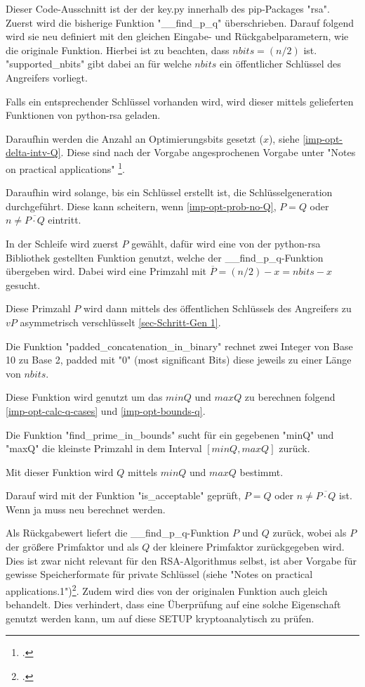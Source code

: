         Dieser Code-Ausschnitt ist der der key.py innerhalb des pip-Packages "rsa".
        Zuerst wird die bisherige Funktion "\_\_find\_p\_q" überschrieben.
        Darauf folgend wird sie neu definiert mit den gleichen Eingabe- und Rückgabelparametern, wie die originale Funktion.
        Hierbei ist zu beachten, dass $nbits = (n/2)$ ist.
        "supported\_nbits" gibt dabei an für welche $nbits$ ein öffentlicher Schlüssel des Angreifers vorliegt. 
        
        Falls ein entsprechender Schlüssel vorhanden wird, wird dieser mittels gelieferten Funktionen von python-rsa geladen.

        Daraufhin werden die Anzahl an Optimierungsbits gesetzt ($x$), siehe \ref{imp-opt-delta-intv-Q}. Diese sind nach der Vorgabe angesprochenen Vorgabe unter "Notes on practical applications" \footcite[1]{dimgt:rsa}.

        Daraufhin wird solange, bis ein Schlüssel erstellt ist, die Schlüsselgeneration durchgeführt. Diese kann scheitern, wenn \ref{imp-opt-prob-no-Q}, $P = Q$ oder $n \neq \overline{P \cdot Q}$ eintritt.

        In der Schleife wird zuerst $P$ gewählt, dafür wird eine von der python-rsa Bibliothek gestellten Funktion genutzt, welche der \_\_find\_p\_q-Funktion übergeben wird. Dabei wird eine Primzahl mit $\overline{P} = (n/2) - x = nbits -  x$ gesucht.
        
        Diese Primzahl $P$ wird dann mittels des öffentlichen Schlüssels des Angreifers zu $vP$ asymmetrisch verschlüsselt \ref{sec-Schritt-Gen 1}.

        Die Funktion "padded\_concatenation\_in\_binary" rechnet zwei Integer von Base 10 zu Base 2, padded mit "0" (most significant Bits) diese jeweils zu einer Länge von $nbits$. 

        Diese Funktion wird genutzt um das $minQ$ und $maxQ$ zu berechnen folgend \ref{imp-opt-calc-q-cases} und \ref{imp-opt-bounds-q}.

        Die Funktion "find\_prime\_in\_bounds" sucht für ein gegebenen "minQ" und "maxQ" die kleinste Primzahl in dem Interval $[minQ, maxQ]$ zurück.

        Mit dieser Funktion wird $Q$ mittels $minQ$ und $maxQ$ bestimmt.

        Darauf wird mit der Funktion "is\_acceptable" geprüft, $P = Q$ oder $n \neq \overline{P \cdot Q}$ ist. Wenn ja muss neu berechnet werden.

        Als Rückgabewert liefert die \_\_find\_p\_q-Funktion $P$ und $Q$ zurück, wobei als $P$ der größere Primfaktor und als $Q$ der kleinere Primfaktor zurückgegeben wird. Dies ist zwar nicht relevant für den \ac{RSA}-Algorithmus selbst, ist aber Vorgabe für gewisse Speicherformate für private Schlüssel (siehe "Notes on practical applications.1")\footcite[1]{dimgt:rsa}. Zudem wird dies von der originalen Funktion auch gleich behandelt. Dies verhindert, dass eine Überprüfung auf eine solche Eigenschaft genutzt werden kann, um auf diese \ac{SETUP} kryptoanalytisch zu prüfen.

